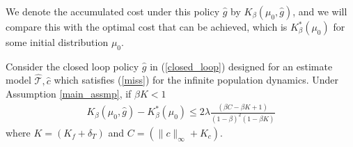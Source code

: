 \documentclass[twoside,11pt]{article}
\begin{document}
We denote the accumulated cost under this policy $\hat{g}$ by $K_\beta(\mu_0,\hat{g})$, and we will compare this with the optimal cost that can be achieved, which is $K_\beta^*(\mu_0)$ for some initial distribution $\mu_0$.

\begin{theorem}\label{closed_inf}
Consider the closed loop policy $\hat{g}$ in (\ref{closed_loop}) designed for an estimate model $\hat{\mathcal{T}},\hat{c}$ which satisfies (\ref{miss}) for the infinite population dynamics. Under Assumption \ref{main_assmp}, if $\beta K<1$
\begin{align*}
K_\beta(\mu_0,\hat{g}) - K_\beta^*(\mu_0) \leq 2\lambda\frac{(\beta C-\beta K +1)}{(1-\beta)^2(1-\beta K)}
\end{align*}
where $K=(K_f + \delta_T)$ and $C=(\|c\|_\infty + K_c)$.
\end{theorem}
\end{document}
